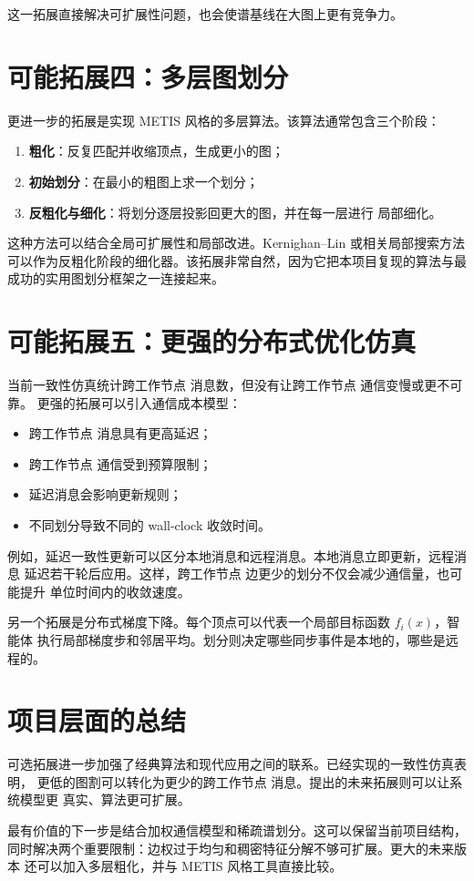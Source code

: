 \documentclass[UTF8, 11pt]{ctexart}
\begin{document}
这一拓展直接解决可扩展性问题，也会使谱基线在大图上更有竞争力。

\section{可能拓展四：多层图划分}

更进一步的拓展是实现 METIS 风格的多层算法。该算法通常包含三个阶段：
\begin{enumerate}
    \item \textbf{粗化}：反复匹配并收缩顶点，生成更小的图；
    \item \textbf{初始划分}：在最小的粗图上求一个划分；
    \item \textbf{反粗化与细化}：将划分逐层投影回更大的图，并在每一层进行
    局部细化。
\end{enumerate}

这种方法可以结合全局可扩展性和局部改进。Kernighan--Lin 或相关局部搜索方法
可以作为反粗化阶段的细化器。该拓展非常自然，因为它把本项目复现的算法与最
成功的实用图划分框架之一连接起来。

\section{可能拓展五：更强的分布式优化仿真}

当前一致性仿真统计跨工作节点 消息数，但没有让跨工作节点 通信变慢或更不可靠。
更强的拓展可以引入通信成本模型：
\begin{itemize}
    \item 跨工作节点 消息具有更高延迟；
    \item 跨工作节点 通信受到预算限制；
    \item 延迟消息会影响更新规则；
    \item 不同划分导致不同的 wall-clock 收敛时间。
\end{itemize}

例如，延迟一致性更新可以区分本地消息和远程消息。本地消息立即更新，远程消息
延迟若干轮后应用。这样，跨工作节点 边更少的划分不仅会减少通信量，也可能提升
单位时间内的收敛速度。

另一个拓展是分布式梯度下降。每个顶点可以代表一个局部目标函数 $f_i(x)$，智能体
执行局部梯度步和邻居平均。划分则决定哪些同步事件是本地的，哪些是远程的。

\section{项目层面的总结}

可选拓展进一步加强了经典算法和现代应用之间的联系。已经实现的一致性仿真表明，
更低的图割可以转化为更少的跨工作节点 消息。提出的未来拓展则可以让系统模型更
真实、算法更可扩展。

最有价值的下一步是结合加权通信模型和稀疏谱划分。这可以保留当前项目结构，
同时解决两个重要限制：边权过于均匀和稠密特征分解不够可扩展。更大的未来版本
还可以加入多层粗化，并与 METIS 风格工具直接比较。
\end{document}
